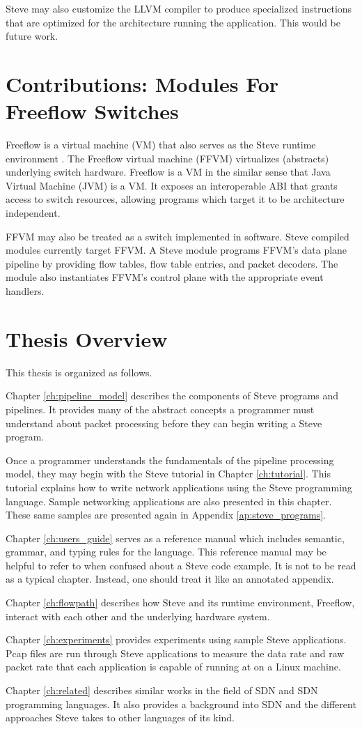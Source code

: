 Steve may also customize the LLVM compiler to produce
specialized instructions that are optimized for the architecture running
the application. This would be future work.

\section{Contributions: Modules For Freeflow Switches}

Freeflow is a virtual machine (VM) that also serves as the Steve runtime
environment \cite{freeflow_software}.
The Freeflow virtual machine (FFVM) virtualizes (abstracts) underlying switch hardware. 
Freeflow is a VM in the similar sense that Java Virtual Machine (JVM) is a VM. 
It exposes an interoperable ABI that grants access to switch resources,
allowing programs which target it to be architecture independent.

FFVM may also be treated as a switch implemented in software.
Steve compiled modules currently target FFVM.
A Steve module programs FFVM's data plane pipeline by providing
flow tables, flow table entries, and packet decoders.
The module also instantiates FFVM's control plane with the appropriate
event handlers.

\section{Thesis Overview}

This thesis is organized as follows.

Chapter \ref{ch:pipeline_model} describes the components of Steve programs
and pipelines. It provides many of the abstract concepts a programmer must
understand about packet processing before they can begin writing a Steve
program.

Once a programmer understands the fundamentals of the pipeline processing model,
they may begin with the Steve tutorial in Chapter \ref{ch:tutorial}.
This tutorial explains how to write network applications using the
Steve programming language. Sample networking applications are also presented in
this chapter. These same samples are presented again in Appendix
\ref{ap:steve_programs}. 

Chapter \ref{ch:users_guide} serves as a reference
manual which includes semantic, grammar, and typing rules for the language.
This reference manual may be helpful to refer to when confused about a
Steve code example.
It is not to be read as a typical chapter. Instead, one should 
treat it like an annotated appendix.

Chapter \ref{ch:flowpath} describes how Steve and its runtime environment, Freeflow,
interact with each other and the underlying hardware system.

Chapter \ref{ch:experiments} provides experiments using sample Steve
applications. Pcap files are run through Steve applications to measure the data
rate and raw packet rate that each application is capable of running at on a
Linux machine.

Chapter \ref{ch:related} describes similar
works in the field of SDN and SDN programming languages. It also provides a
background into SDN and the different approaches Steve takes to other languages
of its kind.
